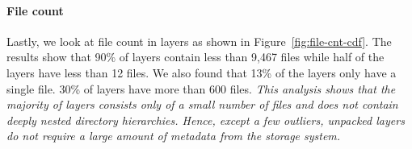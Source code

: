 \paragraph{File count}



Lastly, we look at file count in layers as shown in
Figure~\ref{fig:file-cnt-cdf}.
%
%
The results show that 90\% of layers contain less than 9,467 files while half
of the layers have less than 12 files.
%
We also found that 13\% of the layers only have a single file.
%
30\% of layers have more than 600 files.
%
\emph{This analysis shows that the majority of layers consists only of a small
number of files and does not contain deeply nested directory hierarchies.
%
Hence, except a few outliers, unpacked layers do not require a large amount of
metadata from the storage system.}

%
%

